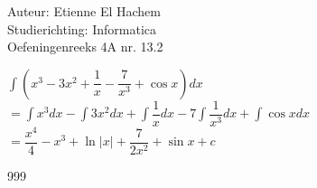 \documentclass[a4paper]{article}
\begin{document}
  
\noindent \large Auteur: Etienne El Hachem \\
\noindent \large Studierichting: Informatica\\
\noindent \large Oefeningenreeks 4A nr. 13.2\\

\medskip

\normalsize

$\displaystyle\int (x^3 - 3x^2 + \dfrac{1}{x} - \dfrac{7}{x^3} + \cos x) dx$ \\

$= \displaystyle\int x^3 dx - \displaystyle\int 3x^2 dx + \displaystyle\int \dfrac{1}{x} dx - 7\displaystyle\int \dfrac{1}{x^3} dx + \displaystyle\int \cos x dx$ \\

$= \dfrac{x^4}{4} - x^3 + \ln |x| + \dfrac{7}{2x^2} + \sin x + c$

\begin{thebibliography}{999}
\end{thebibliography}
\end{document}
